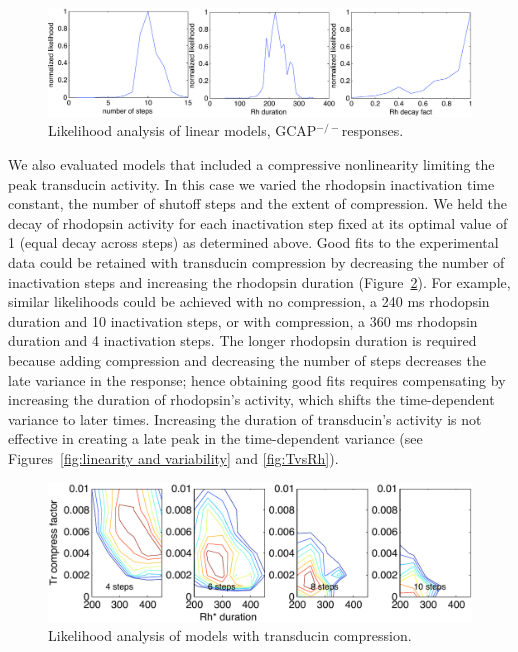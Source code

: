 \documentclass[12pt]{article}
\def\GCAPKO{GCAP$^{-/-}$}
\begin{document}
\begin{figure}[h]
\begin{center}
\includegraphics[width=6in]{GCAPlikelihoodcuts.pdf}
\caption{Likelihood analysis of linear models, \GCAPKO responses.}
\label{fig:GCAPlikelihoodcuts}
\end{center}
\end{figure}

We also evaluated models that included a compressive nonlinearity limiting the peak transducin activity.  In this case we varied the rhodopsin inactivation time constant, the number of shutoff steps and the extent of compression.  We held the decay of rhodopsin activity for each inactivation step fixed at its optimal value of 1 (equal decay across steps) as determined above.  Good fits to the experimental data could be retained with transducin compression by decreasing the number of inactivation steps and increasing the rhodopsin duration (Figure~\ref{fig:TrCompression}).  For example, similar likelihoods could be achieved with no compression, a 240 ms rhodopsin duration and 10 inactivation steps, or with compression, a 360 ms rhodopsin duration and 4 inactivation steps.  The longer rhodopsin duration is required because adding compression and decreasing the number of steps decreases the late variance in the response; hence obtaining good fits requires compensating by increasing the duration of rhodopsin's activity, which shifts the time-dependent variance to later times.  Increasing the duration of transducin's activity is not effective in creating a late peak in the time-dependent variance (see Figures~\ref{fig:linearity and variability} and \ref{fig:TvsRh}).  

\begin{figure}[h]
\begin{center}
\includegraphics[width=6in]{TrCompression.pdf}
\caption{Likelihood analysis of models with transducin compression.}
\label{fig:TrCompression}
\end{center}
\end{figure}
\end{document}
